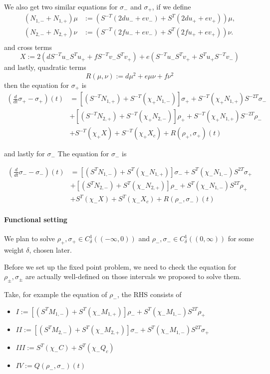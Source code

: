 \documentclass[letterpaper,11pt]{article}
\numberwithin{equation}{section}
\theoremstyle{plain}
\begin{document}
We also get two similar equations for $\sigma_-$ and $\sigma_+$, if we define 
\begin{align*}
(N_{1,-}+N_{1,+})\mu &:= (S^{-T}(2du_-+ev_-)+S^T(2du_++ev_+))\mu, \\ 
(N_{2,-}+N_{2,+})\nu &:=(S^{-T}(2fu_-+ev_-)+S^T(2fu_++ev_+))\nu. \\
\end{align*}
and cross terms
\[
X:=2(dS^{-T}u_-S^Tu_++fS^{-T}v_-S^Tv_+)+e(S^{-T}u_-S^Tv_++S^Tu_+S^{-T}v_-)
\]
and lastly, quadratic terms
\[
R(\mu,\nu):=d\mu^2+e\mu \nu+f\nu^2
\]
then the equation for $\sigma_+$ is
\begin{align*}
\left(\frac{d}{dt} \sigma_+ - \sigma_+\right)(t) &= [(S^{-T}N_{1,+})+S^{-T}(\chi_+N_{1,-})]\sigma_+ + S^{-T}(\chi_+N_{1,+})S^{-2T}\sigma_-\\
&+[(S^{-T}N_{2,+})+S^{-T}(\chi_+N_{2,-})]\rho_+ + S^{-T}(\chi_+N_{1,+})S^{-2T}\rho_-\\
& + S^{-T}(\chi_+X)+S^{-T}(\chi_+X_c) + R(\rho_+,\sigma_+)(t)
\end{align*}

and lastly for $\sigma_-$
The equation for $\sigma_-$ is

\begin{align*}
\left(\frac{d}{dt} \sigma_- - \sigma_-\right)(t) &= [(S^{T}N_{1,-})+S^{T}(\chi_-N_{1,+})]\sigma_- + S^{T}(\chi_-N_{1,-})S^{2T}\sigma_+\\
&+[(S^{T}N_{2,-})+S^{T}(\chi_-N_{2,+})]\rho_- + S^{T}(\chi_-N_{1,-})S^{2T}\rho_+\\
& + S^{T}(\chi_-X)+S^{T}(\chi_-X_c) + R(\rho_-,\sigma_-)(t)
\end{align*}

\paragraph{Functional setting}

We plan to solve $\rho_+,\sigma_+ \in C^1_{\delta}((-\infty,0))$ and $\rho_-,\sigma_- \in C^1_{\delta}((0,\infty))$ for some weight $\delta$, chosen later.

Before we set up the fixed point problem, we need to check the equation for $\rho_\pm, \sigma_\pm$ are actually well-defined on those intervals we proposed to solve them.


Take, for example the equation of $\rho_-$, the RHS consists of
\begin{itemize}

\item $I:=[(S^{T}M_{1,-})+S^{T}(\chi_-M_{1,+})]\rho_- + S^{T}(\chi_-M_{1,-})S^{2T}\rho_+$


\item $II:=[(S^{T}M_{2,-})+S^{T}(\chi_-M_{2,+})]\sigma_- + S^{T}(\chi_-M_{1,-})S^{2T}\sigma_+$


\item $III:=S^{T}(\chi_-C)+S^{T}(\chi_-Q_c)  $

\item $IV:= Q(\rho_-,\sigma_-)(t)$
\end{itemize}
\end{document}
